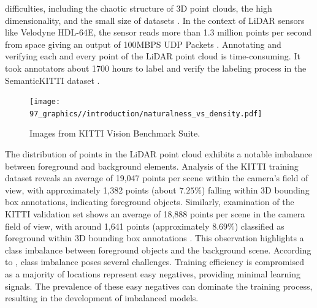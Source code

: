 difficulties, including the chaotic structure of 3D point clouds, the high dimensionality, and the small size of datasets \parencite{qi2017pointnet}. In the context of LiDAR sensors like Velodyne HDL-64E, the sensor reads more than 1.3 million points per second from space giving an output of 100MBPS UDP Packets \parencite{velodyne_64}. Annotating and verifying each and every point of the LiDAR point cloud is time-consuming. It took annotators about 1700 hours to label and verify the labeling process in the SemanticKITTI dataset \parencite{behley2019semantickitti}.

\begin{figure}[htbp]
    \centering
    \texttt{[image: 97\_graphics//introduction/naturalness\_vs\_density.pdf]}
    \caption{Images from KITTI Vision Benchmark Suite\parencite{Geiger2012CVPR}.}
    \label{fig:introduction_surf_variation_in_kitti}
\end{figure}
The distribution of points in the LiDAR point cloud exhibits a notable imbalance between foreground and background elements. Analysis of the KITTI training dataset reveals an average of 19,047 points per scene within the camera's field of view, with approximately 1,382 points (about \(7.25\%\)) falling within 3D bounding box annotations, indicating foreground objects. Similarly, examination of the KITTI validation set shows an average of 18,888 points per scene in the camera field of view, with around 1,641 points (approximately \(8.69\%\)) classified as foreground within 3D bounding box annotations \parencite{DBLP:journals/corr/abs-2004-01643}. This observation highlights a class imbalance between foreground objects and the background scene. According to \parencite{DBLP:journals/corr/abs-1708-02002}, class imbalance poses several challenges. Training efficiency is compromised as a majority of locations represent easy negatives, providing minimal learning signals. The prevalence of these easy negatives can dominate the training process, resulting in the development of imbalanced models.
